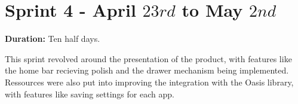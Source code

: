 \section{Sprint 4 - April $23rd$ to May $2nd$}

\textbf{Duration:} Ten half days. \newline

This sprint revolved around the presentation of the product, with features like the home bar recieving polish and the drawer mechanism being implemented. 
Ressources were also put into improving the integration with the Oasis library, with features like saving settings for each app. 